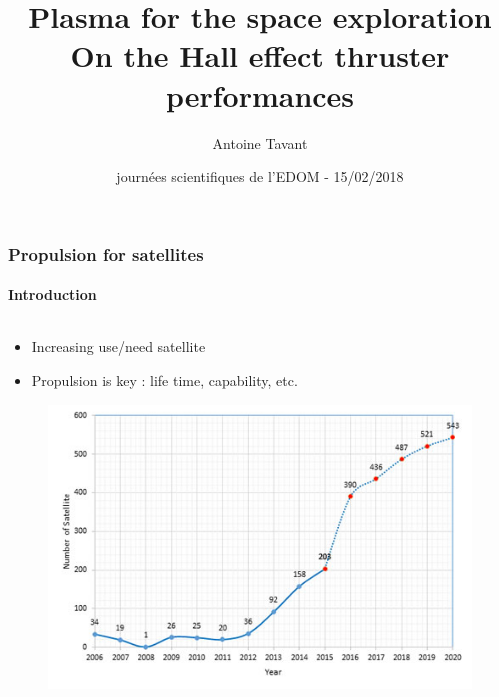\documentclass[sans, aspectratio=169]{beamer}
\title{\textbf{{\LARGE  Plasma for the space exploration}}\\
On the Hall effect thruster performances}
\date[JS-EDOM2018]{journées scientifiques de l'EDOM - 15/02/2018}
\author[A. Tavant]{Antoine Tavant}
\begin{document}
\begin{frame}
\titlepage
\end{frame}

\begin{frame} 
	\frametitle{Propulsion for satellites} 
	\framesubtitle{Introduction} 

	\begin{columns}
		\begin{column}{0.75\linewidth}
		
			\begin{itemize} 
				\item Increasing use/need satellite
				\item Propulsion is key : life time, capability, etc. 

			\end{itemize}
			
			\begin{figure}[hbtp]
				\centering
				\includegraphics[scale=0.3]{images/sattelite-number.jpg}
			\end{figure}
			
			
							
		\end{column}
		

\end{columns}
\end{frame}
\end{document}
